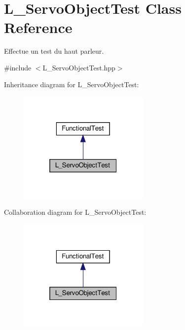 \hypertarget{classL__ServoObjectTest}{}\section{L\+\_\+\+Servo\+Object\+Test Class Reference}
\label{classL__ServoObjectTest}


Effectue un test du haut parleur.  




{\ttfamily \#include $<$L\+\_\+\+Servo\+Object\+Test.\+hpp$>$}



Inheritance diagram for L\+\_\+\+Servo\+Object\+Test\+:
\nopagebreak
\begin{figure}[H]
\begin{center}
\leavevmode
\includegraphics[width=181pt]{classL__ServoObjectTest__inherit__graph}
\end{center}
\end{figure}


Collaboration diagram for L\+\_\+\+Servo\+Object\+Test\+:
\nopagebreak
\begin{figure}[H]
\begin{center}
\leavevmode
\includegraphics[width=181pt]{classL__ServoObjectTest__coll__graph}
\end{center}
\end{figure}
